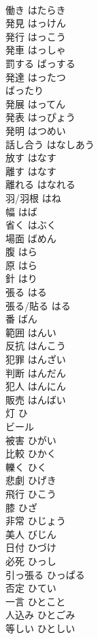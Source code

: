 \documentclass[8pt]{extreport}
\begin{document}
\begin{CJK}{UTF8}{min}
\\	働き	はたらき	
\\	発見	はっけん	
\\	発行	はっこう	
\\	発車	はっしゃ	
\\	罰する	ばっする	
\\	発達	はったつ	
\\	ばったり		
\\	発展	はってん	
\\	発表	はっぴょう	
\\	発明	はつめい	
\\	話し合う	はなしあう	
\\	放す	はなす	
\\	離す	はなす	
\\	離れる	はなれる	
\\	羽/羽根	はね	
\\	幅	はば	
\\	省く	はぶく	
\\	場面	ばめん	
\\	腹	はら	
\\	原	はら	
\\	針	はり	
\\	張る	はる	
\\	張る/貼る	はる	
\\	番	ばん	
\\	範囲	はんい	
\\	反抗	はんこう	
\\	犯罪	はんざい	
\\	判断	はんだん	
\\	犯人	はんにん	
\\	販売	はんばい	
\\	灯	ひ	
\\	ビール		
\\	被害	ひがい	
\\	比較	ひかく	
\\	轢く	ひく	
\\	悲劇	ひげき	
\\	飛行	ひこう	
\\	膝	ひざ	
\\	非常	ひじょう	
\\	美人	びじん	
\\	日付	ひづけ	
\\	必死	ひっし	
\\	引っ張る	ひっぱる	
\\	否定	ひてい	
\\	一言	ひとこと	
\\	人込み	ひとごみ	
\\	等しい	ひとしい	

\end{CJK}
\end{document}
